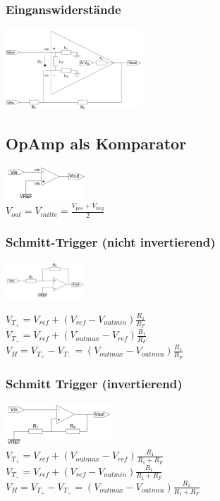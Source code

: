 \documentclass[margin=normal]{tex/hsrzf}
\begin{document}
\begin{multicols}{2}
  \subsubsection*{Einganswiderstände}
  \includegraphics[height=3cm]{img/OpAmp/Fehler_Eingangswiderstand.png}\\
\end{multicols}

\begin{multicols}{2}
  \subsection{OpAmp als Komparator}
  \includegraphics[width=3cm]{img/OpAmp/Komparator.png}\\
  $V_{out} = V_{mitte} = \frac{V_{pos} + V_{neg}}{2}$
  \subsubsection*{Schmitt-Trigger (nicht invertierend)}

  \includegraphics[width=3cm]{img/OpAmp/Schmitt-Trigger_nicht_invertierend.png}


  $V_{T_+} = V_{ref} + (V_{ref} - V_{out min})\frac{R_1}{R_F} $ \\
  $V_{T_-} = V_{ref} + (V_{out max} - V_{ref})\frac{R_1}{R_F} $\\
  $V_H = V_{T_+} - V_{T_-} = (V_{outmax} - V_{outmin})\frac{R_1}{R_F}$

  \subsubsection*{Schmitt Trigger (invertierend)}
  \includegraphics[width=4cm]{img/OpAmp/Schmitt-Trigger_invertierend.png}\\
  $V_{T_+} = V_{ref} + (V_{out max} - V_{ref})\frac{R_1}{R_1 + R_F} $ \\
  $V_{T_-} = V_{ref} + (V_{ref} - V_{out min})\frac{R_1}{R_1 + R_F} $\\
  $V_H = V_{T_+} - V_{T_-} = (V_{outmax} - V_{outmin})\frac{R_1}{R_1+R_F}$
\end{multicols}
\newpage
\end{document}

